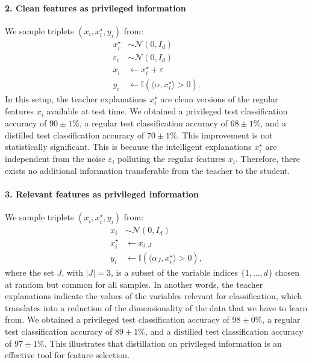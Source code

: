 \documentclass{article}
\begin{document}
\paragraph{2. Clean features as privileged information} We sample 
triplets $(x_i, x^\star_i, y_i)$ from:
\begin{align*}
  x^\star_i     &\sim \mathcal{N}(0,I_d)\\
  \varepsilon_i &\sim \mathcal{N}(0,I_d)\\
  x_i     &\leftarrow x^\star_i + \varepsilon\\
  y_i       &\leftarrow \mathbb{I} \left(\langle \alpha, x^\star_i \rangle > 0\right).
\end{align*}
In this setup, the teacher explanations $x^\star_i$ are clean versions of the
regular features $x_i$ available at test time.  We obtained a privileged test
classification accuracy of $90 \pm 1\%$, a regular test classification accuracy
of $68\pm 1\%$, and a distilled test classification accuracy of
$70\pm 1\%$. This improvement is not statistically significant. This is because
the intelligent explanations $x^\star_i$ are independent from the noise
$\varepsilon_i$ polluting the regular features $x_i$.  Therefore, there exists
no additional information transferable from the teacher to the student.

\paragraph{3. Relevant features as privileged information} We sample triplets
$(x_i, x^\star_i, y_i)$
from:
\begin{align*}
  x_i       &\sim \mathcal{N}(0,I_d)\\
  x^\star_i &\leftarrow x_{i,J}\\
  y_i       &\leftarrow \mathbb{I}(\langle \alpha_J, x^\star_i\rangle > 0),
\end{align*}
where the set $J$, with $|J| = 3$, is a subset of the variable indices $\{1,
\ldots, d\}$ chosen at random but common for all samples. In another words, the
teacher explanations indicate the values of the variables relevant for
classification, which translates into a reduction of the
dimensionality of the data that we have to learn from.  We obtained a
privileged test classification accuracy of $98 \pm 0\%$, a regular test
classification accuracy of $89\pm 1\%$, and a distilled test
classification accuracy of $97\pm 1\%$. This illustrates that distillation on
privileged information is an effective tool for feature selection.
\end{document}
